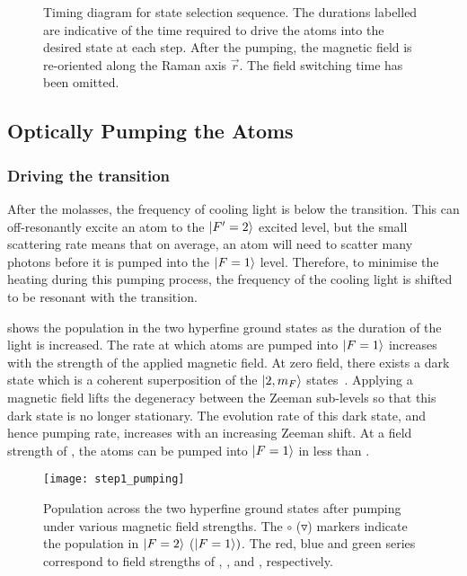 \begin{figure}[!htbp]
    \centering
    \fontsize{14pt}{14pt}
    \resizebox{0.6\textwidth}{!}{}
    \caption[State selection timing schematic]{Timing diagram for state selection sequence. The durations labelled are indicative of the time required to drive the atoms into the desired state at each step. After the  pumping, the magnetic field is re-oriented along the Raman axis \(\vec{r}\). The  field switching time has been omitted.}
    \label{fig:state_selection_timing}
\end{figure}
\subsection{Optically Pumping the Atoms}\label{subsec:optical_pumping}
\subsubsection{Driving the  transition}
After the molasses, the frequency of cooling light is
 below the  transition. This can
off-resonantly excite an atom to the \(\ket{F'=2}\) excited level, but
the small scattering rate means that on average, an atom will need to
scatter many photons before it is pumped into the \(\ket{F=1}\) level.
Therefore, to minimise the heating during this pumping process, the
frequency of the cooling light is shifted to be resonant with the 
transition.
\par\noindent
{} shows the population in the two
hyperfine ground states as the duration of the  light is
increased. The rate at which atoms are pumped into \(\ket{F=1}\)
increases with the strength of the applied magnetic field. At zero
field, there exists a dark state which is a coherent superposition of
the \(\ket{2,m_F}\) states~\cite{Berkeland2002}. Applying a magnetic
field lifts the degeneracy between the Zeeman sub-levels so that this
dark state is no longer stationary. The evolution rate of this dark
state, and hence pumping rate, increases with an increasing Zeeman
shift. At a field strength of , the atoms can be
pumped into \(\ket{F=1}\) in less than .
\begin{figure}[!htbp]
    \centering
    \texttt{[image: step1\_pumping]}
    \caption[Ground state distribution during 
    pumping]{Population across the two hyperfine ground states after
     pumping under various magnetic field strengths. The $\circ$
  ($\smalltriangledown$) markers indicate the population in $\ket{F=2}$ ($\ket{F=1})$. The red, blue and green series correspond to field strengths of , , and , respectively.}
    \label{fig:step1_pumping}
\end{figure}
